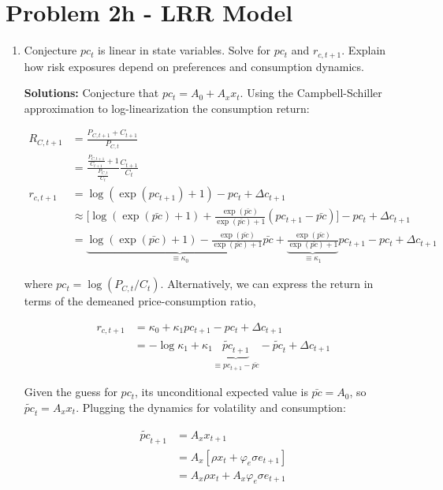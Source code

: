 \documentclass{article}
\begin{document}
\pagebreak

\section{Problem 2h - LRR Model}

\begin{enumerate}

\item Conjecture $pc_t$ is linear in state variables. Solve for $pc_t$ and $r_{c,t+1}$. Explain how risk exposures depend on preferences and consumption dynamics.

\bigskip

\textbf{Solutions:} Conjecture that $pc_t = A_0 + A_x x_t$. 
Using the Campbell-Schiller approximation to log-linearization the consumption return:

\begin{align*}
R_{C,t+1} 
&= \frac{P_{C,t+1} + C_{t+1}}{P_{C,t}} \\
&=  \frac{\frac{P_{C,t+1}}{C_{t+1}} + 1}{\frac{P_{C,t}}{C_t}} \frac{C_{t+1}}{C_{t}}\\
r_{c,t+1} 
&= \log(\exp(pc_{t+1}) +1) - pc_t +\Delta c_{t+1} \\
&\approx \Bigg[\log(\exp(\bar{pc}) +1) + \frac{\exp(\bar{pc})}{\exp(\bar{pc}) + 1} (pc_{t+1} - \bar{pc})\Bigg]- pc_t +\Delta c_{t+1} \\
&= \underbrace{\log(\exp(\bar{pc}) +1)- \frac{\exp(\bar{pc})}{\exp(\bar{pc}) + 1} \bar{pc}}_{\equiv \kappa_0} + \underbrace{\frac{\exp(\bar{pc})}{\exp(\bar{pc}) + 1}}_{\equiv \kappa_1} pc_{t+1} - pc_t +\Delta c_{t+1} 
\end{align*}

where $pc_t = \log(P_{C,t}/C_{t})$. Alternatively, we can express the return in terms of the demeaned price-consumption ratio,

\begin{align*}
r_{c, t+1} 
&= \kappa_0 + \kappa_1 pc_{t+1} - pc_t + \Delta c_{t+1}\\
&= -\log \kappa_1 + \kappa_1 \underbrace{\tilde{pc}_{t+1}}_{\equiv pc_{t+1} - \bar{pc}} - \tilde{pc}_t + \Delta c_{t+1}
\end{align*}

Given the guess for $pc_t$, its unconditional expected value is $\bar{pc} = A_0$, so $\tilde{pc}_t = A_x x_t$. Plugging the dynamics for volatility and consumption:

\begin{align*}
\tilde{pc}_{t+1} 
&= A_x x_{t+1} \\
&= A_x [\rho x_t + \varphi_e \sigma e_{t+1}] \\
&= A_x \rho x_t  + A_x \varphi_e \sigma e_{t+1}  
\end{align*}


\end{enumerate}
\end{document}
